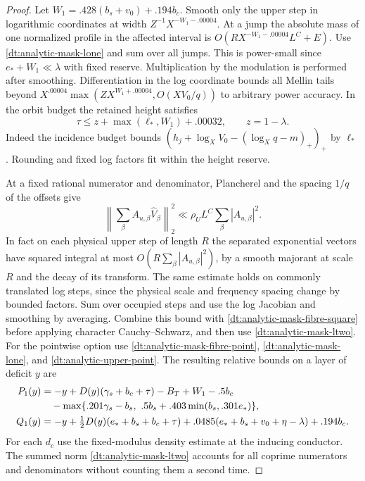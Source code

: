 \documentclass[11pt,a4paper]{article}
\theoremstyle{paperplain}
\numberwithin{equation}{section}
\begin{document}
\begin{proof}
Let \(W_1=.428(b_s+v_0)+.194b_c\). Smooth only the upper step in
logarithmic coordinates at width \(Z^{-1}X^{-W_1-.00004}\).
At a jump the absolute mass of one normalized profile in the
affected interval is \(O(RX^{-W_1-.00004}L^C+E)\).
Use \eqref{dt:analytic-mask-lone} and sum over all jumps. This
is power-small since \(e_*+W_1\ll\lambda\) with fixed reserve.
Multiplication by the modulation is performed after smoothing.
Differentiation in the log coordinate bounds all Mellin tails
beyond \(X^{.00004}\max(ZX^{W_1+.00004},O(XV_0/q))\) to arbitrary
power accuracy. In the orbit budget the retained height satisfies
\begin{equation}\label{dt:analytic-mask-height}
 \tau\le z+\max(\ell_*,W_1)+.00032,\qquad z=1-\lambda.
\end{equation}
Indeed the incidence budget bounds
\((h_j+\log_X V_0-(\log_Xq-m)_+)_+\) by \(\ell_*\).
Rounding and fixed log factors fit within the height reserve.

At a fixed rational numerator and denominator, Plancherel and
the spacing \(1/q\) of the offsets give
\[
 \left\|\sum_\beta A_{u,\beta}\widehat V_\beta\right\|_2^2
 \ll \rho_U L^C\sum_\beta|A_{u,\beta}|^2.
\]
In fact on each physical upper step of length \(R\) the separated
exponential vectors have squared integral at most
\(O(R\sum_\beta|A_{u,\beta}|^2)\), by a smooth majorant at scale
\(R\) and the decay of its transform. The same estimate holds on
commonly translated log steps, since the physical scale and
frequency spacing change by bounded factors. Sum over occupied
steps and use the log Jacobian and smoothing by averaging.
Combine this bound with \eqref{dt:analytic-mask-fibre-square}
before applying character Cauchy--Schwarz, and then use
\eqref{dt:analytic-mask-ltwo}. For the pointwise option use
\eqref{dt:analytic-mask-fibre-point},
\eqref{dt:analytic-mask-lone}, and \eqref{dt:analytic-upper-point}.
The resulting relative bounds on a layer of deficit \(y\) are
\begin{align}
 P_1(y)&=-y+D(y)(\gamma_s+b_c+\tau)-B_T+W_1-.5b_c\notag\\
       &\quad-\max\{.201\gamma_s-b_s,\ .5b_s+.403\min(b_s,.301e_*)\},
            \label{dt:analytic-mask-point-exp}\\
 Q_1(y)&=-y+\tfrac12D(y)(e_*+b_s+b_c+\tau)
                  +.0485(e_*+b_s+v_0+\eta-\lambda)+.194b_c .
            \label{dt:analytic-mask-square-exp}
\end{align}
For each \(d_c\) use the fixed-modulus density estimate at the
inducing conductor. The summed norm
\eqref{dt:analytic-mask-ltwo} accounts for all coprime numerators
and denominators without counting them a second time.


\end{proof}
\end{document}
